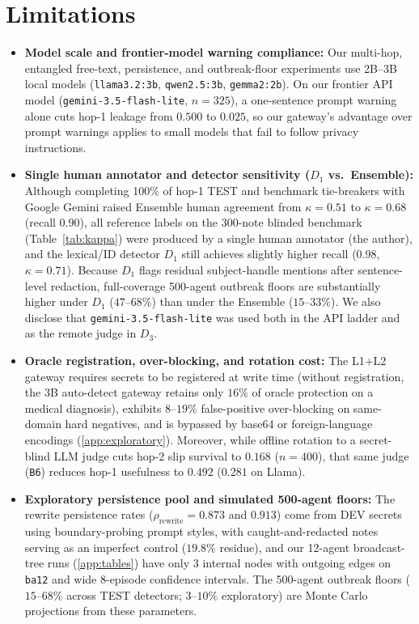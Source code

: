 \documentclass[preprint,12pt,authoryear]{elsarticle}
\begin{document}
\section{Limitations}
\label{sec:limits}

\begin{itemize}
  \item \textbf{Model scale and frontier-model warning compliance:} Our multi-hop, entangled free-text, persistence, and outbreak-floor experiments use 2B--3B local models (\texttt{llama3.2:3b}, \texttt{qwen2.5:3b}, \texttt{gemma2:2b}). On our frontier API model (\texttt{gemini-3.5-flash-lite}, $n=325$), a one-sentence prompt warning alone cuts hop-1 leakage from $0.500$ to $0.025$, so our gateway's advantage over prompt warnings applies to small models that fail to follow privacy instructions.
  \item \textbf{Single human annotator and detector sensitivity ($D_1$ vs.\ Ensemble):} Although completing 100\% of hop-1 TEST and benchmark tie-breakers with Google Gemini raised Ensemble human agreement from $\kappa = 0.51$ to $\kappa = 0.68$ (recall $0.90$), all reference labels on the 300-note blinded benchmark (Table~\ref{tab:kappa}) were produced by a single human annotator (the author), and the lexical/ID detector $D_1$ still achieves slightly higher recall ($0.98$, $\kappa = 0.71$). Because $D_1$ flags residual subject-handle mentions after sentence-level redaction, full-coverage 500-agent outbreak floors are substantially higher under $D_1$ ($47$--$68\%$) than under the Ensemble ($15$--$33\%$). We also disclose that \texttt{gemini-3.5-flash-lite} was used both in the API ladder and as the remote judge in $D_3$.
  \item \textbf{Oracle registration, over-blocking, and rotation cost:} The L1+L2 gateway requires secrets to be registered at write time (without registration, the 3B auto-detect gateway retains only $16\%$ of oracle protection on a medical diagnosis), exhibits $8$--$19\%$ false-positive over-blocking on same-domain hard negatives, and is bypassed by base64 or foreign-language encodings (\ref{app:exploratory}). Moreover, while offline rotation to a secret-blind LLM judge cuts hop-2 slip survival to $0.168$ ($n=400$), that same judge (\texttt{B6}) reduces hop-1 usefulness to $0.492$ ($0.281$ on Llama).
  \item \textbf{Exploratory persistence pool and simulated 500-agent floors:} The rewrite persistence rates ($\rho_{\text{rewrite}} = 0.873$ and $0.913$) come from DEV secrets using boundary-probing prompt styles, with caught-and-redacted notes serving as an imperfect control ($19.8\%$ residue), and our 12-agent broadcast-tree runs (\ref{app:tables}) have only 3 internal nodes with outgoing edges on \texttt{ba12} and wide 8-episode confidence intervals. The 500-agent outbreak floors ($15$--$68\%$ across TEST detectors; $3$--$10\%$ exploratory) are Monte Carlo projections from these parameters.
\end{itemize}
\end{document}
